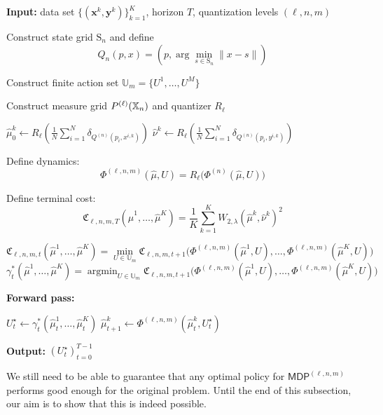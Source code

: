 \documentclass[11pt]{article}
\newcommand{\XX}{\mathbb{X}}
\newcommand{\UU}{\mathbb{U}}
\newcommand{\cP}{\mathcal{P}}
\newcommand{\fC}{\mathfrak{C}}
\newcommand{\argmin}{\operatorname{argmin}}
\begin{document}
\begin{algorithm}[H]
\caption{Triply Quantized Dynamic Programming}
\label{alg:triply}
\begin{algorithmic}[1]

\STATE \textbf{Input:} data set $\{(\mathbf{x}^k,\mathbf{y}^k)\}_{k=1}^K$, horizon $T$, quantization levels $(\ell,n,m)$

\STATE Construct state grid $\mathrm{S}_n$ and define
\begin{equation*}
    Q_n(p,x) = \left(p, \arg\min_{s\in \mathrm{S}_n}\|x-s\|\right)
\end{equation*}

\STATE Construct finite action set $\UU_m = \{U^1,\dots,U^M\}$

\STATE Construct measure grid $\mathcal \cP^{(\ell)}(\XX_n)$ and quantizer $R_\ell$

    \STATE $\hat{\mu}_0^k \leftarrow R_\ell\left(\frac{1}{N} \sum_{i=1}^N \delta_{Q^{(n)}(p_i,x^{i,k})}\right)$
    \STATE $\hat{\nu}^k \leftarrow R_\ell\left(\frac{1}{N} \sum_{i=1}^N \delta_{Q^{(n)}(p_i,y^{i,k})}\right)$
\ENDFOR

\STATE Define dynamics:
\[
\Phi^{(\ell,n,m)}(\hat{\mu},U) = R_\ell\big(\Phi^{(n)}(\hat{\mu},U)\big)
\]

\STATE Define terminal cost:
\[
\fC_{\ell,n,m,T}(\hat{\mu}^1,\dots,\hat{\mu}^K) = \frac1K \sum_{k=1}^K W_{2,\lambda}(\hat{\mu}^k,\hat{\nu}^k)^2
\]

    \FORALL{$(\hat{\mu}^1,\dots,\hat{\mu}^K)\in\cP^{\ell}(\XX_n)^K$}
        \STATE
        \[
        \fC_{\ell,n,m,t}(\hat{\mu}^1,\dots,\hat{\mu}^K)
        =
        \min_{U \in \UU_m}
        \fC_{\ell,n,m,t+1}\big(
        \Phi^{(\ell,n,m)}(\hat{\mu}^1,U),\dots,\Phi^{(\ell,n,m)}(\hat{\mu}^K,U)
        \big)
        \]
        \STATE 
        \[
        \gamma_t^*(\hat{\mu}^1,\dots,\hat{\mu}^K) = \argmin_{U \in \UU_m}\fC_{\ell,n,m,t+1}\big(
        \Phi^{(\ell,n,m)}(\hat{\mu}^1,U),\dots,\Phi^{(\ell,n,m)}(\hat{\mu}^K,U)
        \big)
        \]
    \ENDFOR
\ENDFOR

\STATE \textbf{Forward pass:}

    \STATE $U_t^\star \leftarrow \gamma_t^*(\hat{\mu}_t^1,\dots,\hat{\mu}_t^K)$
        \STATE $\hat{\mu}_{t+1}^k \leftarrow \Phi^{(\ell,n,m)}(\hat{\mu}_t^k, U_t^\star)$
    \ENDFOR
\ENDFOR

\STATE \textbf{Output:} $(U_t^\star)_{t=0}^{T-1}$

\end{algorithmic}
\end{algorithm}
We still need to be able to guarantee that any optimal policy for $\mathsf{MDP}^{(\ell,n,m)}$ performs good enough for the original problem. Until the end of this subsection, our aim is to show that this is indeed possible.
\end{document}
